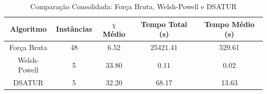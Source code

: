 \begin{table}[H]
\centering
\caption{Comparação Consolidada: Força Bruta, Welsh-Powell e DSATUR}
\label{tab:comparacao_algoritmos_2}
\begin{tabular}{ccccc}
\toprule
Algoritmo & Instâncias & $\chi$ Médio & Tempo Total (s) & Tempo Médio (s) \\
\midrule
Força Bruta & 48 & 6.52 & 25421.41 & 529.61 \\
Welsh-Powell & 5 & 33.80 & 0.11 & 0.02 \\
DSATUR & 5 & 32.20 & 68.17 & 13.63 \\
\bottomrule
\end{tabular}
\end{table}
